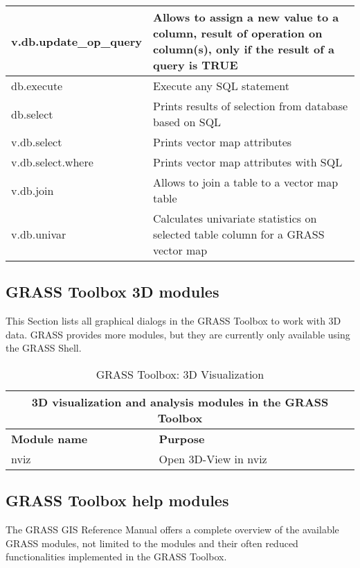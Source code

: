 \begin{table}[ht]
\begin{tabular}{|p{4cm}|p{12cm}|}
  \hline v.db.update\_op\_query & Allows to assign a new value to a column,
  result of operation on column(s), only if the result of a query is TRUE \\
  \hline db.execute & Execute any SQL statement \\
  \hline db.select & Prints results of selection from database based on SQL \\
  \hline v.db.select & Prints vector map attributes \\
  \hline v.db.select.where & Prints vector map attributes with SQL \\
  \hline v.db.join & Allows to join a table to a vector map table \\
  \hline v.db.univar & Calculates univariate statistics on selected table
  column for a GRASS vector map \\
\hline
\end{tabular}
\end{table}

\clearpage

\subsection{GRASS Toolbox 3D modules}

This Section lists all graphical dialogs in the GRASS Toolbox to work with 3D 
data. GRASS provides more modules, but they are currently only available using 
the GRASS Shell.

\begin{table}[ht]
\centering
\caption{GRASS Toolbox: 3D Visualization}\medskip
 \begin{tabular}{|p{4cm}|p{12cm}|}
  \hline \multicolumn{2}{|c|}{\textbf{3D visualization and analysis modules in the GRASS
  Toolbox}} \\
  \hline \textbf{Module name} & \textbf{Purpose} \\
  \hline nviz & Open 3D-View in nviz\\
\hline
\end{tabular}
\end{table}

\subsection{GRASS Toolbox help modules}

The GRASS GIS Reference Manual offers a complete overview of the available 
GRASS modules, not limited to the modules and their often reduced functionalities 
implemented in the GRASS Toolbox. 

